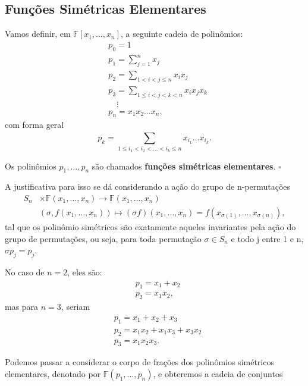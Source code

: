 \documentclass[../algebraIII_notes.tex]{subfiles}
\begin{document}
\subsection{Funções Simétricas Elementares}
Vamos definir, em \(\mathbb{F}[x_1, \dotsc , x_{n}]\), a seguinte cadeia de polinômios:
\begin{align*}
	 & p_{0} = 1                                           \\
	 & p_1 = \sum\limits_{j=1}^{n}x_{j}                    \\
	 & p_2 = \sum\limits_{1<i<j\leq n}^{}x_{i}x_{j}        \\
	 & p_3 = \sum\limits_{1\leq i<j<k<n}^{}x_{i}x_{j}x_{k} \\
	 & \quad \vdots                                        \\
	 & p_{n}= x_1x_2 \dotsc x_{n},
\end{align*}
com forma geral
\[
	p_{k} = \sum\limits_{1\leq i_{1}<i_{2}<\dotsc <i_{k}\leq n}^{}x_{i_1}\dotsc x_{i_{k}}.
\]
\begin{def*}
	Os polinômios \(p_1, \dotsc , p_{n}\) são chamados \textbf{funções simétricas elementares}. \(\square\)
\end{def*}
A justificativa para isso se dá considerando a ação do grupo de n-permutações
\begin{align*}
	S_{n} & \times \mathbb{F}(x_1, \dotsc , x_{n})\rightarrow \mathbb{F}(x_1, \dotsc , x_{n})                                     \\
	      & (\sigma , f(x_1, \dotsc , x_{n}))\mapsto (\sigma f)(x_1, \dotsc , x_{n}) = f(x_{\sigma(1)}, \dotsc , x_{\sigma (n)}),
\end{align*}
tal que os polinômio simétricos são exatamente aqueles invariantes pela ação do grupo de permutações, ou seja, para toda permutação \(\sigma \in S_{n}\) e todo j entre 1 e n, \(\sigma p_{j} = p_{j}\).
\begin{example}
	No caso de \(n=2\), eles são:
	\begin{align*}
		 & p_1 = x_1 + x_2 \\
		 & p_2 = x_1x_2,
	\end{align*}
	mas para \(n=3\), seriam
	\begin{align*}
		 & p_1 = x_1 + x_2 + x_3          \\
		 & p_2 = x_1x_2 + x_1x_3 + x_3x_2 \\
		 & p_3 = x_1x_2x_3.
	\end{align*}
\end{example}
Podemos passar a considerar o corpo de frações dos polinômios simétricos elementares, denotado por \(\mathbb{F}(p_1, \dotsc , p_{n})\), e obteremos a cadeia de conjuntos
\end{document}
